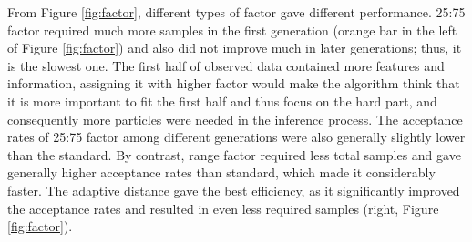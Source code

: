 From Figure \ref{fig:factor}, different types of factor gave different performance. 25:75 factor required much more samples in the first generation (orange bar in the left of Figure \ref{fig:factor}) and also did not improve much in later generations; thus, it is the slowest one. The first half of observed data contained more features and information, assigning it with higher factor would make the algorithm think that it is more important to fit the first half and thus focus on the hard part, and consequently more particles were needed in the inference process. The acceptance rates of 25:75 factor among different generations were also generally slightly lower than the standard. By contrast, range factor required less total samples and gave generally higher acceptance rates than standard, which made it considerably faster. The adaptive distance gave the best efficiency, as it significantly improved the acceptance rates and resulted in even less required samples (right, Figure \ref{fig:factor}).

